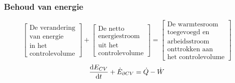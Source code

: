 \documentclass[t]{beamer}
\begin{document}
  	\begin{frame}
		\frametitle{Behoud van energie}
		\vspace{0.5cm}
		\begin{equation*}
			\left[
				\begin{array}{c}
					\mbox{De verandering} \\ \mbox{van energie} \\ \mbox{in het} \\ \mbox{controlevolume}
				\end{array}
			\right]
			+
			\left[
				\begin{array}{c}
					\mbox{De netto} \\ \mbox{energiestroom} \\ \mbox{uit het} \\ \mbox{controlevolume}
				\end{array}
			\right]
			=
			\left[
				\begin{array}{c}
					\mbox{De warmtesroom} \\ \mbox{toegevoegd en} \\   \mbox{arbeidsstroom} \\ \mbox{onttrokken aan } \\ \mbox{het controlevolume}
				\end{array}
			\right]
			\label{eqn:controlevolume,behoud van energie,woorden}
		\end{equation*}
		\vspace{1cm}
		\pause
		\begin{equation}
			\frac{\mathrm{d} E_{CV}}{\mathrm{d} t} + \dot{E}_{\partial CV} =  \dot{Q}-\dot{W}
			\label{eqn:controlevolume,behoud van energie}
		\end{equation}
	\end{frame}	
\end{document}
